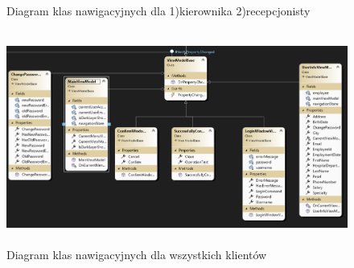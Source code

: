\begin{flushleft}
\begin{figure}[H]
    \label{fig:diag_kl_nav_dok_gl_kier}
    \end{figure}

    \begin{figure}[H]
    \centering
    \caption{Diagram klas nawigacyjnych dla 1)kierownika 2)recepcjonisty}
 
    \label{fig:diag_kl_nav_mang_recep}
    \end{figure}

    \begin{figure}[H]
    \begin{center}
	\includegraphics[height=7cm]{images/diag_kl_nav_wszt.png}
        \caption{Diagram klas nawigacyjnych dla wszystkich klientów}
        \label{fig:diag_kl_nav_recep}
    \end{center}
    \end{figure}
    

\end{flushleft}
